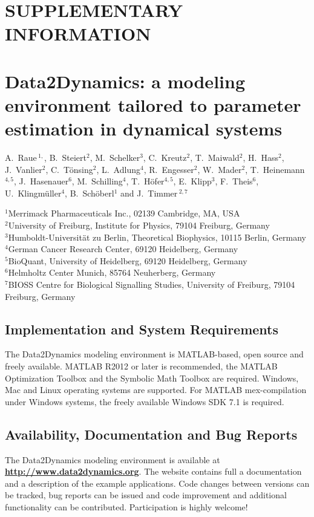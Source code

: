 \documentclass[12pt,a4paper]{scrartcl}
\begin{document}
\section*{SUPPLEMENTARY INFORMATION}
\section*{Data2Dynamics: a modeling environment tailored to parameter 
estimation in dynamical systems}

\noindent 
A.~Raue\,$^{1,}$, 
B.~Steiert$^{2}$, 
M.~Schelker$^{3}$, 
C.~Kreutz$^{2}$, 
T.~Maiwald$^{2}$, 
H.~Hass$^{2}$, 
J.~Vanlier$^{2}$, 
C.~T\"onsing$^{2}$, 
L.~Adlung$^{4}$, 
R.~Engesser$^{2}$, 
W.~Mader$^{2}$, 
T.~Heinemann$^{4,5}$, 
J.~Hasenauer$^{6}$, 
M.~Schilling$^{4}$, 
T.~H\"ofer$^{4,5}$, 
E.~Klipp$^{3}$, 
F.~Theis$^{6}$, 
U.~Klingm\"uller$^{4}$, 
B.~Sch\"oberl$^{1}$ and 
J.~Timmer\,$^{2,7}$

\noindent $^{1}$Merrimack Pharmaceuticals Inc., 02139 Cambridge, MA, USA\\
$^{2}$University of Freiburg, Institute for Physics, 79104 Freiburg, Germany\\
$^{3}$Humboldt-Universit\"at zu Berlin, Theoretical Biophysics, 10115 Berlin, Germany\\
$^{4}$German Cancer Research Center, 69120 Heidelberg, Germany\\
$^{5}$BioQuant, University of Heidelberg, 69120 Heidelberg, Germany\\
$^{6}$Helmholtz Center Munich, 85764 Neuherberg, Germany\\
$^{7}$BIOSS Centre for Biological Signalling Studies, University of Freiburg, 79104 Freiburg, Germany

\subsection*{Implementation and System Requirements} 
The Data2Dynamics modeling environment is MATLAB-based, 
open source and freely available. 
MATLAB R2012 or later is recommended, the MATLAB 
Optimization Toolbox and the Symbolic Math Toolbox are required. 
Windows, Mac and Linux operating systems are supported. 
For MATLAB mex-compilation under Windows systems, 
the freely available Windows SDK 7.1 is required.

\subsection*{Availability, Documentation and Bug Reports}
The Data2Dynamics modeling environment is available at 
\href{http://www.data2dynamics.org}{{\bf http://www.data2dynamics.org}}. 
The website contains full a documentation and a 
description of the example applications. Code changes between versions can be tracked, 
bug reports can be issued and code improvement 
and additional functionality can be contributed. Participation is highly welcome! 
\end{document}

